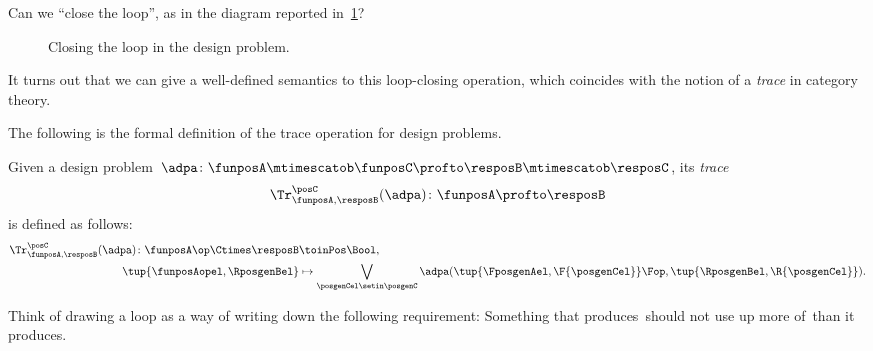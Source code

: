 Can we ``close the loop'', as in the diagram reported in~\cref{fig:extrace_2}?
\begin{figure}[h!]
    \centering
    \caption{Closing the loop in the design problem.
    }
    \label{fig:extrace_2}
\end{figure}

It turns out that we can give a well-defined semantics to this loop-closing operation, which coincides with the notion of a \emph{trace} in category theory.

The following is the formal definition of the trace operation for design problems.

\begin{definition}
    \label{def:dp-trace}
    Given a design problem~$\adpa\colon  \funposA \mtimescatob \funposC \profto \resposB \mtimescatob \resposC$, its \emph{trace}
    \begin{equation}
        \Tr_{\funposA,\resposB}^\posC(\adpa) \colon \funposA \profto \resposB
    \end{equation}
    is defined as follows:
    \begin{equation}
        \label{eq:tracedef}
        \begin{aligned}
            \Tr_{\funposA,\resposB}^\posC(\adpa) \colon  \funposA\op \Ctimes \resposB & \toinPos \Bool, \\
            \tup{\funposAopel, \RposgenBel}                                           & \mapsto \bigvee_{\posgenCel \setin \posgenC}
            \adpa(\tup{\FposgenAel, \F{\posgenCel}}\Fop,
            \tup{\RposgenBel, \R{\posgenCel}}).
        \end{aligned}
    \end{equation}
\end{definition}

Think of drawing a loop as a way of writing down the following requirement:
Something that produces~\posC should not use up more of~\posC than it produces.

